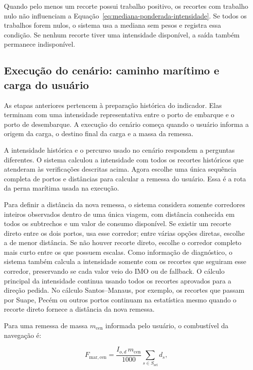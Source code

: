 Quando pelo menos um recorte possui trabalho positivo, os recortes com trabalho nulo não influenciam a Equação~\ref{eq:mediana-ponderada-intensidade}. Se todos os trabalhos forem nulos, o sistema usa a mediana sem pesos e registra essa condição. Se nenhum recorte tiver uma intensidade disponível, a saída também permanece indisponível.

\subsection*{Execução do cenário: caminho marítimo e carga do usuário}

As etapas anteriores pertencem à preparação histórica do indicador. Elas terminam com uma intensidade representativa entre o porto de embarque e o porto de desembarque. A execução do cenário começa quando o usuário informa a origem da carga, o destino final da carga e a massa da remessa.

A intensidade histórica e o percurso usado no cenário respondem a perguntas diferentes. O sistema calculou a intensidade com todos os recortes históricos que atenderam às verificações descritas acima. Agora escolhe uma única sequência completa de portos e distâncias para calcular a remessa do usuário. Essa é a rota da perna marítima usada na execução.

Para definir a distância da nova remessa, o sistema considera somente corredores inteiros observados dentro de uma única viagem, com distância conhecida em todos os subtrechos e um valor de consumo disponível. Se existir um recorte direto entre os dois portos, usa esse corredor; entre várias opções diretas, escolhe a de menor distância. Se não houver recorte direto, escolhe o corredor completo mais curto entre os que possuem escalas. Como informação de diagnóstico, o sistema também calcula a intensidade somente com os recortes que seguiram esse corredor, preservando se cada valor veio do IMO ou de fallback. O cálculo principal da intensidade continua usando todos os recortes aprovados para a direção pedida. No cálculo Santos--Manaus, por exemplo, os recortes que passam por Suape, Pecém ou outros portos continuam na estatística mesmo quando o recorte direto fornece a distância da nova remessa.

Para uma remessa de massa \(m_{\mathrm{cen}}\) informada pelo usuário, o combustível da navegação é:

\begin{equation}
F_{\mathrm{mar,cen}}=\frac{I_{o,d}\,m_{\mathrm{cen}}}{1000}
\sum_{s\in S_{\mathrm{sel}}}d_s,
\label{eq:combustivel-maritimo-cenario}
\end{equation}

